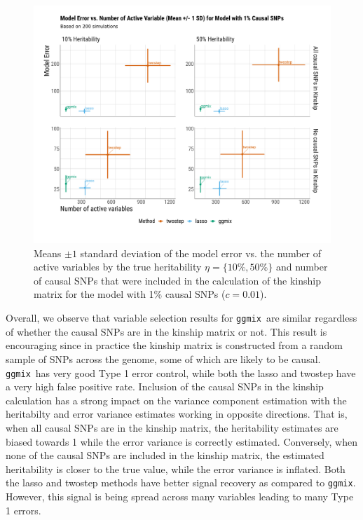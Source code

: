 \documentclass[12pt,letter]{article}\usepackage[]{graphicx}\usepackage[]{color}
\newenvironment{knitrout}{}{} %
\newcommand{\ggmix}{\texttt{ggmix}}
\begin{document}
\begin{knitrout}\scriptsize
{}\color{fgcolor}\begin{figure}[H]

{\centering \includegraphics[width=1\linewidth]{figure/plot-me-nactive-sim-1p-causal-1} 

}

\caption[Means $\pm 1$ standard deviation of the model error vs]{Means $\pm 1$ standard deviation of the model error vs. the number of active variables by the true heritability $\eta = \lbrace 10\%, 50\% \rbrace$ and number of causal SNPs that were included in the calculation of the kinship matrix for the model with 1\% causal SNPs ($c=0.01$).}\label{fig:plot-me-nactive-sim-1p-causal}
\end{figure}


\end{knitrout}

Overall, we observe that variable selection results for \ggmix ~are similar regardless of whether the causal SNPs are in the kinship matrix or not.
This result is encouraging since in practice the kinship matrix is constructed from a random sample of SNPs across the genome, some of which are likely to be causal.
\ggmix ~has very good Type 1 error control, while both the lasso and twostep have a very high false positive rate.
Inclusion of the causal SNPs in the kinship calculation has a strong impact on the variance component estimation with the heritabilty and error variance estimates working in opposite directions.
That is, when all causal SNPs are in the kinship matrix, the heritability estimates are biased towards 1 while the error variance is correctly estimated.
Conversely, when none of the causal SNPs are included in the kinship matrix, the estimated heritability is closer to the true value, while the error variance is inflated.
Both the lasso and twostep methods have better signal recovery as compared to \ggmix.
However, this signal is being spread across many variables leading to many Type 1 errors.
\end{document}
